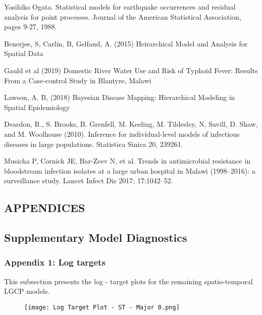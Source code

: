 \documentclass[a4paper]{thesis}
\begin{document}
\begin{thebibliography}{99}
 Yosihiko Ogata. Statistical models for earthquake occurrences and residual analysis for
point processes. Journal of the American Statistical Association, pages 9-27, 1988.

 Benerjee, S, Carlin, B, Gelfand, A. (2015) Heirarchical Model and Analysis for Spatial Data

 Gauld et al (2019) Domestic River Water Use and Risk of Typhoid Fever: Results From a Case-control Study in Blantyre, Malawi

 Lawson, A. B, (2018) Bayesian Disease Mapping: Hierarchical Modeling in Spatial Epidemiology

Deardon, R., S. Brooks, B. Grenfell, M. Keeling, M. Tildesley, N. Savill,
D. Shaw, and M. Woolhouse (2010). Inference for individual-level models
of infectious diseases in large populations. Statistica Sinica 20, 239{261}.

 Musicha P, Cornick JE, Bar-Zeev N, et al. Trends in antimicrobial resistance in
bloodstream infection isolates at a large urban hospital in Malawi (1998–2016): a
surveillance study. Lancet Infect Dis 2017; 17:1042–52.

\end{thebibliography}

\begin{center}
\chapter{APPENDICES}
\end{center} 

\section{Supplementary 
Model Diagnostics}

\subsection{Appendix 1: Log targets}

This subsection presents the log - target plots for the remaining spatio-temporal LGCP models. 

\begin{figure}[H]
\begin{center}
\texttt{[image: Log Target Plot - ST - Major 0.png]}
\end{center}
\end{figure}
\end{document}
